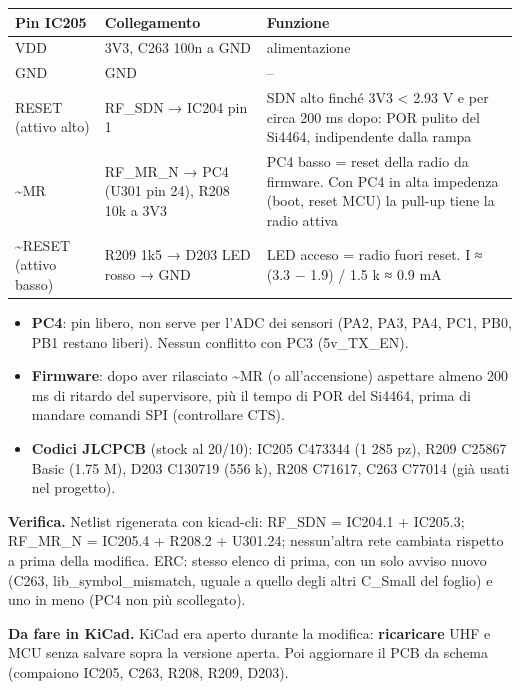 {\small{}\setlength{\tabcolsep}{4pt}\renewcommand{\arraystretch}{1.1}
\begin{longtable}{>{\raggedright\arraybackslash}p{}>{\raggedright\arraybackslash}p{}>{\raggedright\arraybackslash}p{}}
\toprule
\textbf{Pin IC205} & \textbf{Collegamento} & \textbf{Funzione} \\
\midrule
\endhead
\bottomrule\endfoot
5 VDD & 3V3, C263 100n a GND & alimentazione \\\midrule[0.15pt]
2 GND & GND & – \\\midrule[0.15pt]
3 RESET (attivo alto) & RF\_\allowbreak{}SDN → IC204 pin 1 & SDN alto finché 3V3 < 2.93 V e per circa 200 ms dopo: POR pulito del Si4464, indipendente dalla rampa \\\midrule[0.15pt]
4 \textasciitilde{}MR & RF\_\allowbreak{}MR\_\allowbreak{}N → PC4 (U301 pin 24), R208 10k a 3V3 & PC4 basso = reset della radio da firmware. Con PC4 in alta impedenza (boot, reset MCU) la pull-up tiene la radio attiva \\\midrule[0.15pt]
1 \textasciitilde{}RESET (attivo basso) & R209 1k5 → D203 LED rosso → GND & LED acceso = radio fuori reset. I ≈ (3.3 − 1.9) /\allowbreak{} 1.5 k ≈ 0.9 mA \\
\end{longtable}}

\begin{itemize}
\item \textbf{PC4}: pin libero, non serve per l'ADC dei sensori (PA2, PA3, PA4, PC1, PB0, PB1 restano liberi). Nessun conflitto con PC3 (5v\_\allowbreak{}TX\_\allowbreak{}EN).
\item \textbf{Firmware}: dopo aver rilasciato \textasciitilde{}MR (o all'accensione) aspettare almeno 200 ms di ritardo del supervisore, più il tempo di POR del Si4464, prima di mandare comandi SPI (controllare CTS).
\item \textbf{Codici JLCPCB} (stock al 20/\allowbreak{}10): IC205 C473344 (1 285 pz), R209 C25867 Basic (1.75 M), D203 C130719 (556 k), R208 C71617, C263 C77014 (già usati nel progetto).
\end{itemize}

\textbf{Verifica.} Netlist rigenerata con kicad-cli: RF\_\allowbreak{}SDN = IC204.1 + IC205.3; RF\_\allowbreak{}MR\_\allowbreak{}N = IC205.4 + R208.2 + U301.24; nessun'altra rete cambiata rispetto a prima della modifica. ERC: stesso elenco di prima, con un solo avviso nuovo (C263, lib\_\allowbreak{}symbol\_\allowbreak{}mismatch, uguale a quello degli altri C\_\allowbreak{}Small del foglio) e uno in meno (PC4 non più scollegato).

\begin{notebox}
\textbf{Da fare in KiCad.} KiCad era aperto durante la modifica: \textbf{ricaricare} UHF e MCU senza salvare sopra la versione aperta. Poi aggiornare il PCB da schema (compaiono IC205, C263, R208, R209, D203).
\end{notebox}
